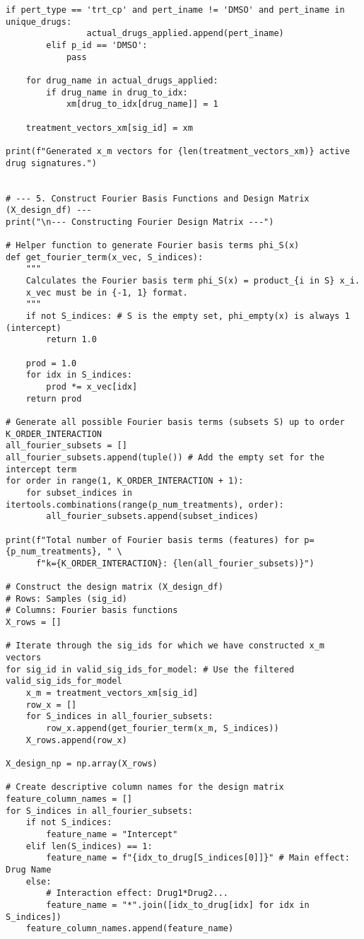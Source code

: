 \documentclass[12pt]{article}
\begin{document}
\begin{lstlisting}[caption={Python Analysis Script}]
            if pert_type == 'trt_cp' and pert_iname != 'DMSO' and pert_iname in unique_drugs:
                actual_drugs_applied.append(pert_iname)
        elif p_id == 'DMSO':
            pass 

    for drug_name in actual_drugs_applied:
        if drug_name in drug_to_idx:
            xm[drug_to_idx[drug_name]] = 1
    
    treatment_vectors_xm[sig_id] = xm

print(f"Generated x_m vectors for {len(treatment_vectors_xm)} active drug signatures.")


# --- 5. Construct Fourier Basis Functions and Design Matrix (X_design_df) ---
print("\n--- Constructing Fourier Design Matrix ---")

# Helper function to generate Fourier basis terms phi_S(x)
def get_fourier_term(x_vec, S_indices):
    """
    Calculates the Fourier basis term phi_S(x) = product_{i in S} x_i.
    x_vec must be in {-1, 1} format.
    """
    if not S_indices: # S is the empty set, phi_empty(x) is always 1 (intercept)
        return 1.0
    
    prod = 1.0
    for idx in S_indices:
        prod *= x_vec[idx]
    return prod

# Generate all possible Fourier basis terms (subsets S) up to order K_ORDER_INTERACTION
all_fourier_subsets = []
all_fourier_subsets.append(tuple()) # Add the empty set for the intercept term
for order in range(1, K_ORDER_INTERACTION + 1):
    for subset_indices in itertools.combinations(range(p_num_treatments), order):
        all_fourier_subsets.append(subset_indices)

print(f"Total number of Fourier basis terms (features) for p={p_num_treatments}, " \
      f"k={K_ORDER_INTERACTION}: {len(all_fourier_subsets)}")

# Construct the design matrix (X_design_df)
# Rows: Samples (sig_id)
# Columns: Fourier basis functions
X_rows = []

# Iterate through the sig_ids for which we have constructed x_m vectors
for sig_id in valid_sig_ids_for_model: # Use the filtered valid_sig_ids_for_model
    x_m = treatment_vectors_xm[sig_id]
    row_x = []
    for S_indices in all_fourier_subsets:
        row_x.append(get_fourier_term(x_m, S_indices))
    X_rows.append(row_x)

X_design_np = np.array(X_rows)

# Create descriptive column names for the design matrix
feature_column_names = []
for S_indices in all_fourier_subsets:
    if not S_indices:
        feature_name = "Intercept"
    elif len(S_indices) == 1:
        feature_name = f"{idx_to_drug[S_indices[0]]}" # Main effect: Drug Name
    else:
        # Interaction effect: Drug1*Drug2...
        feature_name = "*".join([idx_to_drug[idx] for idx in S_indices])
    feature_column_names.append(feature_name)


\end{lstlisting}
\end{document}
